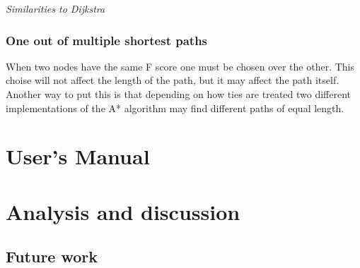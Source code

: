 \documentclass[12pt, a4paper]{article}
\begin{document}
\textit{Similarities to Dijkstra}




\subsubsection{One out of multiple shortest paths}

When two nodes have the same F score one must be chosen over the other. This
choise will not affect the length of the path, but it may affect the path
itself. Another way to put this is that depending on how ties are treated two
different implementations of the A* algorithm may find different paths of equal
length. \cite{astar2}


\section{User's Manual}





\section{Analysis and discussion}
\label{Analysis}





\subsection{Future work}








\pagebreak


\end{document}
